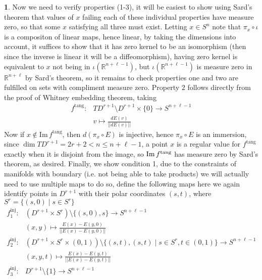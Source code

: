 \documentclass[10.5pt]{article}
\theoremstyle{definition}
\newtheorem{pb}{}
\newcommand{\set}[1]{\{#1\}}
\newcommand{\norm}[1]{\lvert\lvert#1\rvert\rvert}
\begin{document}
\begin{pb}
        Now we need to verify properties (1-3), it will be easiest to show using Sard's theorem that values of \(x\) failing each of these individual properties have measure zero, so that some \(x\) satisfying all three must exist. Letting \(x \in S^n\) note that \(\pi_x\circ \iota\) is a compositon of linear maps, hence linear, by taking the dimensions into account, it suffices to show that it has zero kernel to be an isomorphism (then since the inverse is linear it will be a diffeomorphism), having zero kernel is equivalent to \(x\) not being in \(\iota(\mathbb{R}^{n + \ell - 1})\), but \(\iota(\mathbb{R}^{n + \ell - 1})\) is measure zero in \(\mathbb{R}^{n + \ell}\) by Sard's theorem, so it remains to check properties one and two are fulfilled on sets with compliment measure zero. Property \(2\) follows directly from the proof of Whitney embedding theorem, taking \begin{align*}
            f^{\text{tang}} : &TD^{r+1} \setminus D^{r+1} \times \set{0} \to S^{n + \ell - 1} \\
            &v \mapsto \frac{dE(v)}{\norm{dE(v)}}
        \end{align*}
        Now if \(x \not \in \text{Im}\,f^{\text{tang}}\), then \(d(\pi_x\circ E)\) is injective, hence \(\pi_x \circ E\) is an immersion, since \(\dim TD^{r+1} = 2r+2 < n \leq n + \ell - 1\), a point \(x\) is a regular value for \(f^{\text{tang}}\) exactly when it is disjoint from the image, so \(\text{Im}\,f^\text{\text{tang}}\) has measure zero by Sard's theorem, as desired. Finally, we show condition 1, due to the constraints of manifolds with boundary (i.e. not being able to take products) we will actually need to use multiple maps to do so, define the following maps here we again identify points in \(D^{r+1}\) with their polar coordinates \((s,t)\), where \(S^r = \set{(s,0) \mid s \in S^r}\)
        \begin{align*}
            f^\text{inj}_1: &(D^{r+1} \times S^r) \setminus \set{(s,0),s} \to S^{n + \ell - 1}  \\
            &(x,y) \mapsto \frac{E(x) - E(y,0)}{\norm{E(x) - E(y,0)}} \\
            f^{\text{inj}}_2: &(D^{r+1} \times S^r \times (0,1)) \setminus \set{(s,t),(s,t) \mid s \in S^r, t\in (0,1)} \to S^{n + \ell - 1}  \\
            &(x,y,t) \mapsto \frac{E(x) - E(y,t)}{\norm{E(x) - E(y,t)}}\\
            f^\text{inj}_3: &D^{r+1} \setminus \set{1} \to S^{n + \ell - 1}  \\

\end{align*}
\end{pb}
\end{document}
